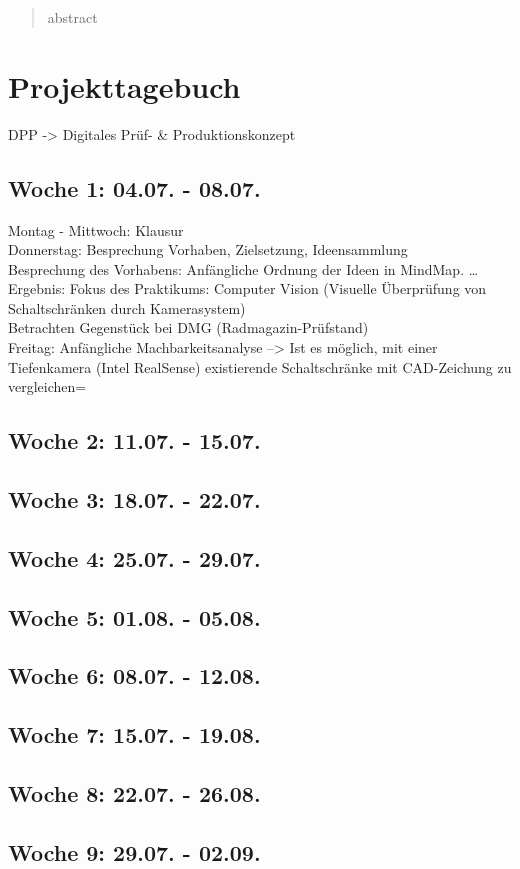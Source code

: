\documentclass[
type=Projektarbeit,
status=draft, %
language=german, %
bibengine=bibtex,
]{unibwm-inf-thesis}
\begin{document}
\tableofcontents

\mainmatter
\begin{abstract}
    abstract
\end{abstract}
\chapter{Projekttagebuch}\label{ch:projekttagebuch}
DPP -> Digitales Prüf- \& Produktionskonzept
\section*{Woche 1: 04.07. - 08.07.}
Montag - Mittwoch: Klausur\\
Donnerstag: Besprechung Vorhaben, Zielsetzung, Ideensammlung\\
Besprechung des Vorhabens: Anfängliche Ordnung der Ideen in MindMap.  \dots\\
Ergebnis: Fokus des Praktikums: Computer Vision (Visuelle Überprüfung von Schaltschränken durch Kamerasystem)\\
Betrachten Gegenstück bei DMG (Radmagazin-Prüfstand) \\
Freitag: Anfängliche Machbarkeitsanalyse --> Ist es möglich, mit einer Tiefenkamera (\zB Intel RealSense) existierende Schaltschränke mit CAD-Zeichung zu vergleichen=

\section*{Woche 2: 11.07. - 15.07.}
\section*{Woche 3: 18.07. - 22.07.}
\section*{Woche 4: 25.07. - 29.07.}
\section*{Woche 5: 01.08. - 05.08.}
\section*{Woche 6: 08.07. - 12.08.}
\section*{Woche 7: 15.07. - 19.08.}
\section*{Woche 8: 22.07. - 26.08.}
\section*{Woche 9: 29.07. - 02.09.}






\end{document}
